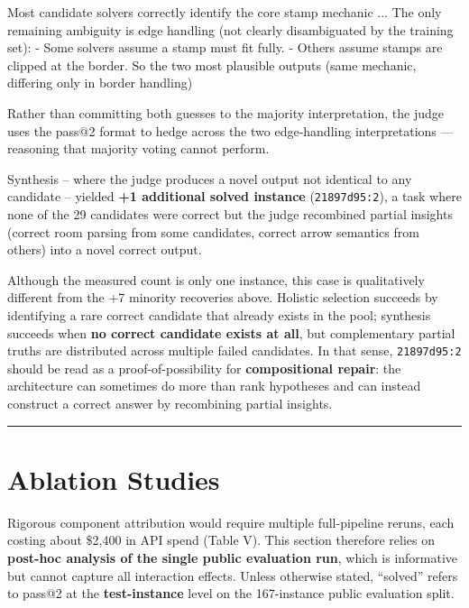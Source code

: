 \documentclass[conference]{IEEEtran}
\newenvironment{Shaded}{}{}
\newcommand{\NormalTok}[1]{#1}
\renewenvironment{Shaded}{\begin{snugshade}}{\end{snugshade}}
\begin{document}
\begin{Shaded}
\begin{Highlighting}[]
\NormalTok{Most candidate solvers correctly identify the core stamp}
\NormalTok{mechanic ... The only remaining ambiguity is edge handling}
\NormalTok{(not clearly disambiguated by the training set):}
\NormalTok{{-} Some solvers assume a stamp must fit fully.}
\NormalTok{{-} Others assume stamps are clipped at the border.}
\NormalTok{So the two most plausible outputs (same mechanic,}
\NormalTok{differing only in border handling)}
\end{Highlighting}
\end{Shaded}

Rather than committing both guesses to the majority interpretation, the
judge uses the pass@2 format to hedge across the two edge-handling
interpretations --- reasoning that majority voting cannot perform.

Synthesis -- where the judge produces a novel output not identical to
any candidate -- yielded \textbf{+1 additional solved instance}
(\texttt{21897d95:2}), a task where none of the 29 candidates were
correct but the judge recombined partial insights (correct room parsing
from some candidates, correct arrow semantics from others) into a novel
correct output.

Although the measured count is only one instance, this case is
qualitatively different from the +7 minority recoveries above. Holistic
selection succeeds by identifying a rare correct candidate that already
exists in the pool; synthesis succeeds when \textbf{no correct candidate
exists at all}, but complementary partial truths are distributed across
multiple failed candidates. In that sense, \texttt{21897d95:2} should be
read as a proof-of-possibility for \textbf{compositional repair}: the
architecture can sometimes do more than rank hypotheses and can instead
construct a correct answer by recombining partial insights.

\begin{center}\rule{0.5\linewidth}{0.5pt}\end{center}

\section{Ablation Studies}\label{ablation-studies}

Rigorous component attribution would require multiple full-pipeline
reruns, each costing about \$2,400 in API spend (Table V). This section
therefore relies on \textbf{post-hoc analysis of the single public
evaluation run}, which is informative but cannot capture all interaction
effects. Unless otherwise stated, ``solved'' refers to pass@2 at the
\textbf{test-instance} level on the 167-instance public evaluation
split.
\end{document}
